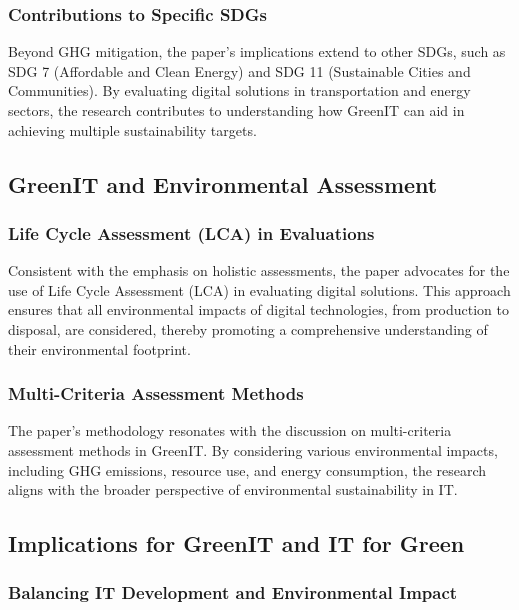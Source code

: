 \documentclass[conference,compsoc]{IEEEtran}
\begin{document}
\subsubsection{Contributions to Specific SDGs}

Beyond GHG mitigation, the paper's implications extend to other SDGs, such as SDG 7 (Affordable and Clean Energy) and SDG 11 (Sustainable Cities and Communities). By evaluating digital solutions in transportation and energy sectors, the research contributes to understanding how GreenIT can aid in achieving multiple sustainability targets.

\subsection{GreenIT and Environmental Assessment}

\subsubsection{Life Cycle Assessment (LCA) in Evaluations}

Consistent with the  emphasis on holistic assessments, the paper advocates for the use of Life Cycle Assessment (LCA) in evaluating digital solutions. This approach ensures that all environmental impacts of digital technologies, from production to disposal, are considered, thereby promoting a comprehensive understanding of their environmental footprint.

\subsubsection{Multi-Criteria Assessment Methods}

The paper's methodology resonates with the  discussion on multi-criteria assessment methods in GreenIT. By considering various environmental impacts, including GHG emissions, resource use, and energy consumption, the research aligns with the broader perspective of environmental sustainability in IT.

\subsection{Implications for GreenIT and IT for Green}

\subsubsection{Balancing IT Development and Environmental Impact}
\end{document}
